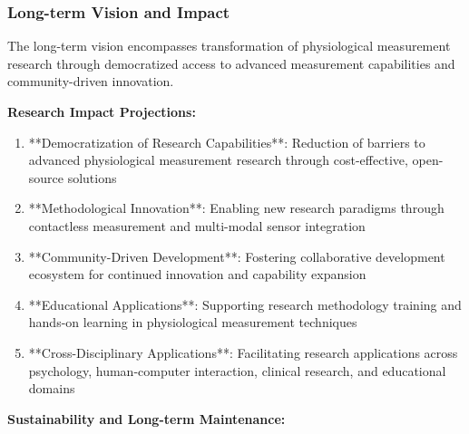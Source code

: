 \documentclass[11pt,a4paper]{article}
\begin{document}
\subsubsection{Long-term Vision and Impact}

The long-term vision encompasses transformation of physiological measurement research through democratized access to
advanced measurement capabilities and community-driven innovation.

\textbf{Research Impact Projections:}

\begin{enumerate}
\item **Democratization of Research Capabilities**: Reduction of barriers to advanced physiological measurement research
   through cost-effective, open-source solutions
\item **Methodological Innovation**: Enabling new research paradigms through contactless measurement and multi-modal sensor
   integration
\item **Community-Driven Development**: Fostering collaborative development ecosystem for continued innovation and
   capability expansion
\item **Educational Applications**: Supporting research methodology training and hands-on learning in physiological
   measurement techniques
\item **Cross-Disciplinary Applications**: Facilitating research applications across psychology, human-computer
   interaction, clinical research, and educational domains

\end{enumerate}
\textbf{Sustainability and Long-term Maintenance:}
\end{document}
